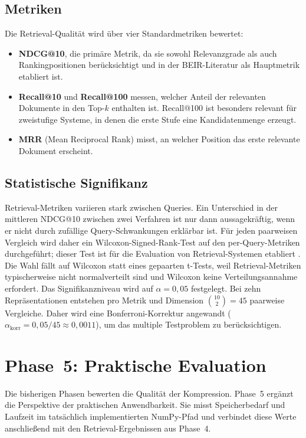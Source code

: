 \subsection{Metriken}
%
Die Retrieval-Qualität wird über vier Standardmetriken bewertet:
\begin{itemize}
  \item \textbf{NDCG@10}, die primäre Metrik, da sie sowohl Relevanzgrade als auch Rankingpositionen berücksichtigt und in der BEIR-Literatur als Hauptmetrik etabliert ist.
  \item \textbf{Recall@10} und \textbf{Recall@100} messen, welcher Anteil der relevanten Dokumente in den Top-$k$ enthalten ist.
Recall@100 ist besonders relevant für zweistufige Systeme, in denen die erste Stufe eine Kandidatenmenge erzeugt.
  \item \textbf{MRR} (Mean Reciprocal Rank) misst, an welcher Position das erste relevante Dokument erscheint.
\end{itemize}
%
\subsection{Statistische Signifikanz}
%
Retrieval-Metriken variieren stark zwischen Queries.
Ein Unterschied in der mittleren NDCG@10 zwischen zwei Verfahren ist nur dann aussagekräftig, wenn er nicht durch zufällige Query-Schwankungen erklärbar ist.
%
Für jeden paarweisen Vergleich wird daher ein Wilcoxon-Signed-Rank-Test \cite{wilcoxon_1945_ranking} auf den per-Query-Metriken durchgeführt; dieser Test ist für die Evaluation von Retrieval-Systemen etabliert \cite{smucker_2007_significance}.
Die Wahl fällt auf Wilcoxon statt eines gepaarten t-Tests, weil Retrieval-Metriken typischerweise nicht normalverteilt sind und Wilcoxon keine Verteilungsannahme erfordert.
%
Das Signifikanzniveau wird auf $\alpha = 0{,}05$ festgelegt.
Bei zehn Repräsentationen entstehen pro Metrik und Dimension $\binom{10}{2} = 45$ paarweise Vergleiche.
Daher wird eine Bonferroni-Korrektur angewandt ($\alpha_\text{korr} = 0{,}05 / 45 \approx 0{,}0011$), um das multiple Testproblem zu berücksichtigen.
%
\section{Phase~5: Praktische Evaluation}
\label{sec:methodik_phase5}
%
Die bisherigen Phasen bewerten die Qualität der Kompression.
Phase~5 ergänzt die Perspektive der praktischen Anwendbarkeit.
Sie misst Speicherbedarf und Laufzeit im tatsächlich implementierten NumPy-Pfad und verbindet diese Werte anschließend mit den Retrieval-Ergebnissen aus Phase~4.
%
